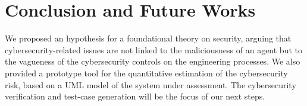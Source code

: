 \documentclass[conference]{IEEEtran}
\newcommand{\fixnote}[2]{\textbf{\color{red}{FIX}}\footnote{{\bf #1:} #2}}
\begin{document}
%

\section{Conclusion and Future Works}
We proposed an hypothesis for a foundational theory on security, arguing that
cybersecurity-related issues are not linked to the maliciousness of an agent but to
the vagueness of the cybersecurity controls on the engineering processes.
We also provided a prototype tool for the quantitative estimation of the cybersecurity
risk, based on a UML model of the system under assessment.
The cybersecurity verification and test-case generation will be the focus of our next steps.
\end{document}
